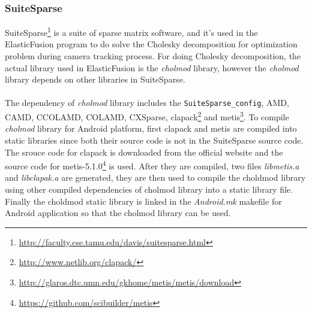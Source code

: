 \documentclass[12pt,twoside]{article}
\begin{document}
\subsubsection{SuiteSparse}
SuiteSparse\footnote{\url{http://faculty.cse.tamu.edu/davis/suitesparse.html}} is a suite of sparse matrix software, and it's used in the ElasticFusion program to do solve the Cholesky decomposition for optimization problem during camera tracking process. For doing Cholesky decomposition, the actual library used in ElasticFusion is the \textit{cholmod} library, however the \textit{cholmod} library depends on other libraries in SuiteSparse.\\
\\
The dependency of \textit{cholmod} library includes the \verb|SuiteSparse_config|, AMD, CAMD, CCOLAMD, COLAMD, CXSparse, clapack\footnote{\url{http://www.netlib.org/clapack/}} and metis\footnote{\url{http://glaros.dtc.umn.edu/gkhome/metis/metis/download}}. To compile \textit{cholmod} library for Android platform, first clapack and metis are compiled into static libraries since both their source code is not in the SuiteSparse source code. The srouce code for clapack is downloaded from the official website and the source code for metis-5.1.0\footnote{\url{https://github.com/scibuilder/metis}} is used. After they are compiled, two files \textit{libmetis.a} and \textit{libclapak.a} are generated, they are then used to compile the choldmod library using other compiled dependencies of cholmod library into a static library file. Finally the choldmod static library is linked in the \textit{Android.mk} makefile for Android application so that the cholmod library can be used.
\end{document}
